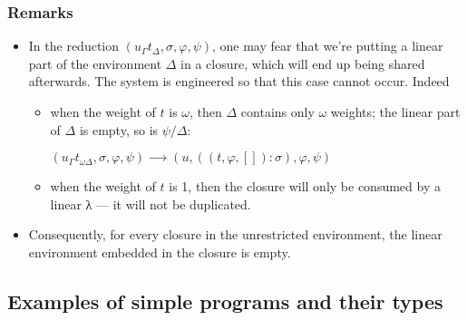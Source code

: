 \documentclass[11pt]{article}
\begin{document}
\subsubsection{Remarks}
\label{sec:orgheadline13}

\begin{itemize}
\item In the reduction \((u_Γ t_Δ,σ,φ,ψ)\), one may fear that we're
putting a linear part of the environment \(Δ\) in a closure, which will
end up being shared afterwards. The system is engineered so that
this case cannot occur. Indeed
\begin{itemize}
\item when the weight of \(t\) is \(ω\), then \(Δ\) contains only \(ω\) weights; the
linear part of \(Δ\) is empty, so is \(ψ/Δ\):

\((u_Γ t_{ωΔ},σ,φ,ψ)          ⟶ (u,((t,φ,[]):σ),φ,ψ)\)

\item when the weight of \(t\) is 1, then the closure will only be consumed
by a linear λ --- it will not be duplicated.
\end{itemize}

\item Consequently, for every closure in the unrestricted environment, the
linear environment embedded in the closure is empty.
\end{itemize}


\subsection{Examples of simple programs and their types}
\end{document}
